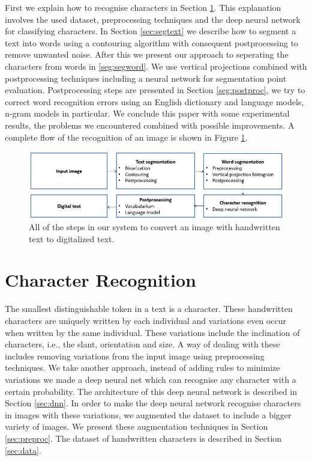 \documentclass{article}
\begin{document}
First we explain how to recognise characters in Section \ref{sec:charrec}. This explanation involves the used dataset, preprocessing techniques and the deep neural network for classifying characters. 
In Section \ref{sec:segtext} we describe how to segment a text into words using a contouring algorithm with consequent postprocessing to remove unwanted noise. 
After this we present our approach to seperating the characters from words in \ref{seg:segword}. We use vertical projections combined with postprocessing techniques including a neural network for segmentation point evaluation.
Postprocessing steps are presented in Section \ref{seg:postproc}, we try to correct word recognition errors using an English dictionary and language models, n-gram models in particular.
We conclude this paper with some experimental results, the problems we encountered combined with possible improvements. A complete flow of the recognition of an image is shown in Figure \ref{fig:flow}.

\begin{figure}
  \centering
  \includegraphics[width=\linewidth]{images/flow_hor}
  \caption{All of the steps in our system to convert an image with handwritten text to digitalized text.}
  \label{fig:flow}
\end{figure}

\section{Character Recognition}
\label{sec:charrec}
The smallest distinguishable token in a text is a character. These handwritten characters are uniquely 
written by each individual and variations even occur when written by the same individual. These variations include the inclination of characters, i.e., the slant, orientation and size. 
A way of dealing with these includes removing variations from the input image using preprocessing techniques. 
We take another approach, instead of adding rules to minimize variations we made a deep neural net which can recognise any character with a certain probability. The architecture of this deep neural network is described in Section \ref{sec:dnn}. 
In order to make the deep neural network recognise characters in images with these variations, we augmented the dataset to include a bigger variety of images. We present these augmentation techniques in Section \ref{sec:preproc}. 
The dataset of handwritten characters is described in Section \ref{sec:data}.
\end{document}
